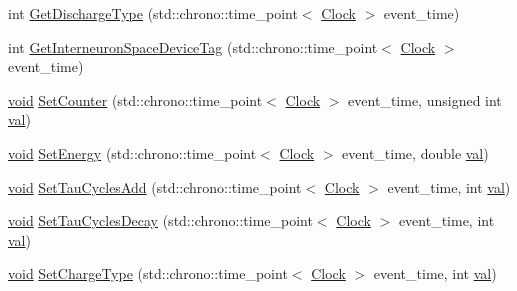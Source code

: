 \begin{DoxyCompactItemize}
int \mbox{\hyperlink{class_interneuron_space_ae65bf091b84fa11459ef754ed1c7bf21}{Get\+Discharge\+Type}} (std\+::chrono\+::time\+\_\+point$<$ \mbox{\hyperlink{universe_8h_a0ef8d951d1ca5ab3cfaf7ab4c7a6fd80}{Clock}} $>$ event\+\_\+time)
\item 
int \mbox{\hyperlink{class_interneuron_space_a66b6683bab6872dfece6111a8ccfb1d7}{Get\+Interneuron\+Space\+Device\+Tag}} (std\+::chrono\+::time\+\_\+point$<$ \mbox{\hyperlink{universe_8h_a0ef8d951d1ca5ab3cfaf7ab4c7a6fd80}{Clock}} $>$ event\+\_\+time)
\item 
\mbox{\hyperlink{glad_8h_a950fc91edb4504f62f1c577bf4727c29}{void}} \mbox{\hyperlink{class_interneuron_space_a60a46f22a2e575d65031635a698a60a9}{Set\+Counter}} (std\+::chrono\+::time\+\_\+point$<$ \mbox{\hyperlink{universe_8h_a0ef8d951d1ca5ab3cfaf7ab4c7a6fd80}{Clock}} $>$ event\+\_\+time, unsigned int \mbox{\hyperlink{glad_8h_a26942fd2ed566ef553eae82d2c109c8f}{val}})
\item 
\mbox{\hyperlink{glad_8h_a950fc91edb4504f62f1c577bf4727c29}{void}} \mbox{\hyperlink{class_interneuron_space_a65ecd1914ab039707313beb1b8702e68}{Set\+Energy}} (std\+::chrono\+::time\+\_\+point$<$ \mbox{\hyperlink{universe_8h_a0ef8d951d1ca5ab3cfaf7ab4c7a6fd80}{Clock}} $>$ event\+\_\+time, double \mbox{\hyperlink{glad_8h_a26942fd2ed566ef553eae82d2c109c8f}{val}})
\item 
\mbox{\hyperlink{glad_8h_a950fc91edb4504f62f1c577bf4727c29}{void}} \mbox{\hyperlink{class_interneuron_space_ad6c1387daa261a3e8e1dba1402101d5c}{Set\+Tau\+Cycles\+Add}} (std\+::chrono\+::time\+\_\+point$<$ \mbox{\hyperlink{universe_8h_a0ef8d951d1ca5ab3cfaf7ab4c7a6fd80}{Clock}} $>$ event\+\_\+time, int \mbox{\hyperlink{glad_8h_a26942fd2ed566ef553eae82d2c109c8f}{val}})
\item 
\mbox{\hyperlink{glad_8h_a950fc91edb4504f62f1c577bf4727c29}{void}} \mbox{\hyperlink{class_interneuron_space_a7f44a965e377ecdc5c387af2b5d30d69}{Set\+Tau\+Cycles\+Decay}} (std\+::chrono\+::time\+\_\+point$<$ \mbox{\hyperlink{universe_8h_a0ef8d951d1ca5ab3cfaf7ab4c7a6fd80}{Clock}} $>$ event\+\_\+time, int \mbox{\hyperlink{glad_8h_a26942fd2ed566ef553eae82d2c109c8f}{val}})
\item 
\mbox{\hyperlink{glad_8h_a950fc91edb4504f62f1c577bf4727c29}{void}} \mbox{\hyperlink{class_interneuron_space_a404aacb1adce30288bb7b4237344e4cc}{Set\+Charge\+Type}} (std\+::chrono\+::time\+\_\+point$<$ \mbox{\hyperlink{universe_8h_a0ef8d951d1ca5ab3cfaf7ab4c7a6fd80}{Clock}} $>$ event\+\_\+time, int \mbox{\hyperlink{glad_8h_a26942fd2ed566ef553eae82d2c109c8f}{val}})
\item 

\end{DoxyCompactItemize}

